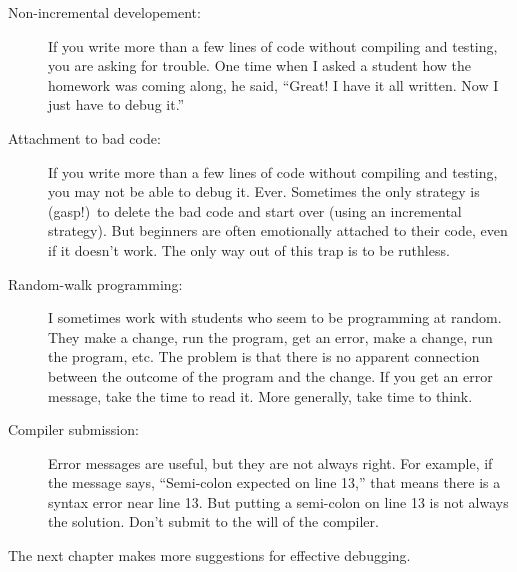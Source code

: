 \begin{description}

\item[Non-incremental developement:] If you write more than a few
  lines of code without compiling and testing, you are asking for
  trouble.  One time when I asked a student how the homework was
  coming along, he said, ``Great!  I have it all written.  Now I just
  have to debug it.''

\item[Attachment to bad code:] If you write more than a few lines of
  code without compiling and testing, you may not be able to debug it.
  Ever.  Sometimes the only strategy is (gasp!)~to delete the bad
  code and start over (using an incremental strategy).  But beginners
  are often emotionally attached to their code, even if it doesn't
  work.  The only way out of this trap is to be ruthless.

\item[Random-walk programming:] I sometimes work with students who
  seem to be programming at random.  They make a change, run the
  program, get an error, make a change, run the program, etc.  The
  problem is that there is no apparent connection between the outcome
  of the program and the change.
%
  If you get an error message, take the time to read it.
  More generally, take time to think.

\item[Compiler submission:] Error messages are useful, but they
  are not always right.  For example, if the message says, ``Semi-colon
  expected on line 13,'' that means there is a syntax error near
  line 13. But putting a semi-colon on line 13 is not always the
  solution.  Don't submit to the will of the compiler.

\end{description}

The next chapter makes more suggestions for effective debugging.


